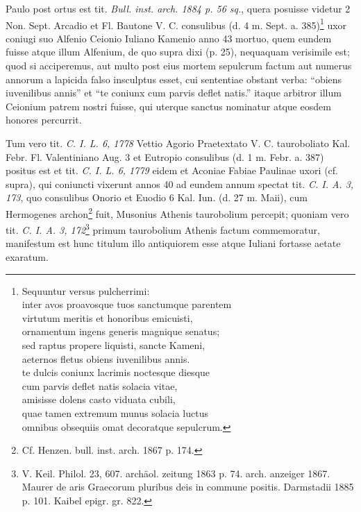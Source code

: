 \documentclass[a4paper, 11pt, oneside, polutonikogreek, german]{article}
\begin{document}
Paulo post ortus est tit. \emph{Bull. inst. arch. 1884 p. 56 sq.}, quera posuisse videtur 2 Non. Sept. Arcadio et Fl. Bautone V. C. consulibus (d. 4 m. Sept. a. 385)\footnote{Sequuntur versus pulcherrimi:\\\hspace*{10mm}inter avos proavosque tuos sanctumque parentem\\\hspace*{10mm}virtutum meritis et honoribus emicuisti,\\\hspace*{10mm}ornamentum ingens generis magnique senatus;\\\hspace*{10mm}sed raptus propere liquisti, sancte Kameni,\\\hspace*{10mm}aeternos fletus obiens iuvenilibus annis.\\\hspace*{10mm}te dulcis coniunx lacrimis noctesque diesque\\\hspace*{10mm}cum parvis deflet natis solacia vitae,\\\hspace*{10mm}amisisse dolens casto viduata cubili,\\\hspace*{10mm}quae tamen extremum munus solacia luctus\\\hspace*{10mm}omnibus obsequiis omat decoratque sepulcrum.} uxor coniugi suo Alfenio Ceionio Iuliano Kamenio anno 43 mortuo, quem eundem fuisse atque illum Alfenium, de quo supra dixi (p. 25), nequaquam verisimile est; quod si acciperemus, aut multo post eius mortem sepulcrum factum aut numerus annorum a lapicida falso insculptus esset, cui sententiae obstant verba: "`obiens iuvenilibus annis"' et "`te coniunx cum parvis deflet natis."' itaque arbitror illum Ceionium patrem nostri fuisse, qui uterque sanctus nominatur atque eosdem honores percurrit.

Tum vero tit. \emph{C. I. L. 6, 1778} Vettio Agorio Praetextato V. C. tauroboliato Kal. Febr. Fl. Valentiniano Aug. 3 et Eutropio consulibus (d. 1 m. Febr. a. 387) positus est et tit. \emph{C. I. L. 6, 1779} eidem et Aconiae Fabiae Paulinae uxori (cf. supra), qui coniuncti vixerunt annos 40 ad eundem annum spectat tit. \emph{C. I. A. 3, 173}, quo consulibus Onorio et Euodio 6 Kal. Iun. (d. 27 m. Maii), cum Hermogenes archon\footnote{Cf. Henzen. bull. inst. arch. 1867 p. 174.} fuit, Musonius Athenis taurobolium percepit; quoniam vero tit. \emph{C. I. A. 3, 172}\footnote{V. Keil. Philol. 23, 607. archäol. zeitung 1863 p. 74. arch. anzeiger 1867. Maurer de aris Graecorum pluribus deis in commune positis. Darmstadii 1885 p. 101. Kaibel epigr. gr. 822.} primum taurobolium Athenis factum commemoratur, manifestum est hunc titulum illo antiquiorem esse atque Iuliani fortasse aetate exaratum.
\end{document}
